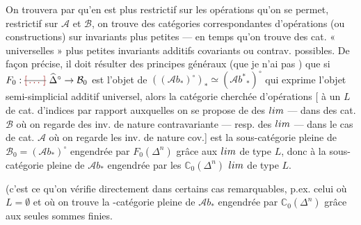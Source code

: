 \documentclass[11pt,a4paper]{article}
\begin{document}
On trouvera par  qu'en est plus restrictif sur les opérations qu'on
se permet, \struck{\ill{}}  \struck{\ill{}}
 restrictif sur $\mathcal{A}$ et $\mathcal{B}$, on trouve des
catégories correspondantes d'opérations (ou constructions) sur invariants plus petites
--- \struck{\ill{}} en  temps qu'on trouve des cat. « universelles » plus
petites \struck{\ill{}}  invariants additifs covariants ou
contrav. possibles. \struck{\ill{}} De façon précise, il doit résulter des principes
généraux (que je n'ai pas ) que si \struck{\ill{}}
$F_{0} : \text{\struck{\ill{}}}\ \widehat{\Delta}^{\circ} \to \mathcal{B}_{0}$
est l'objet de $((\mathcal{A}b_{*})^{\circ})_{*} \simeq (\mathcal{A}b^{*}{}_{*})^{\circ}$
qui exprime l'objet  semi-simplicial additif universel, alors la
\struck{\ill{}} catégorie cherchée d'opérations [ à un
 $L$ de cat. d'indices par rapport auxquelles on se propose de
\struck{\ill{}}  des $\varprojlim$ --- dans des cat. $\mathcal{B}$
où on regarde des inv. de nature contravariante --- resp. des $\varinjlim$ --- dans le
cas de cat. $\mathcal{A}$ où on regarde les inv. de nature cov.] est la sous-catégorie
pleine  de $\mathcal{B}_{0} = (\mathcal{A}b_{*})^{\circ}$ engendrée par
$F_{0}(\Delta^{n})$ grâce aux $\varprojlim$ de type $L$,  
donc à la sous-catégorie pleine de $\mathcal{A}b_{*}$ engendrée par les
$\mathbb{C}_{0}(\Delta^{n})$  $\varinjlim$ de type $L$.

(c'est ce qu'on vérifie directement dans certains cas remarquables, p.ex. celui où
$L = \emptyset$ et où on trouve la -catégorie pleine de
$\mathcal{A}b_{*}$ engendrée par  $\mathbb{C}_{0}(\Delta^{n})$ grâce aux seules
sommes finies.
\end{document}
